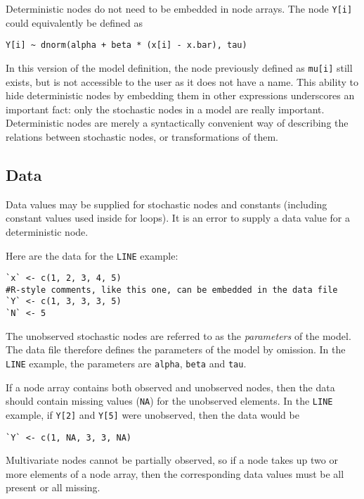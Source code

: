 \documentclass[11pt, a4paper, titlepage]{report}
\newcommand{\R}{\textsf{R}}
\begin{document}
Deterministic nodes do not need to be embedded in node arrays. The
node \verb+Y[i]+ could equivalently be defined as
\begin{verbatim}
Y[i] ~ dnorm(alpha + beta * (x[i] - x.bar), tau)
\end{verbatim}
In this version of the model definition, the node previously defined
as \verb+mu[i]+ still exists, but is not accessible to the user as it
does not have a name.  This ability to hide deterministic nodes by
embedding them in other expressions underscores an important fact:
only the stochastic nodes in a model are really
important. Deterministic nodes are merely a syntactically convenient
way of describing the relations between stochastic nodes, or
transformations of them.

\subsection{Data}
\label{section:data}

Data values may be supplied for stochastic
nodes and constants (including constant values used inside for
loops).
It is an error to supply a data value for a deterministic
node.

Here are the data for the \verb+LINE+ example:
\begin{verbatim}
`x` <- c(1, 2, 3, 4, 5)
#R-style comments, like this one, can be embedded in the data file
`Y` <- c(1, 3, 3, 3, 5)
`N` <- 5
\end{verbatim}

The unobserved stochastic nodes are referred to as the {\em
  parameters} of the model. The data file therefore defines the
parameters of the model by omission. In the \verb+LINE+ example, the
parameters are \texttt{alpha}, \texttt{beta} and \texttt{tau}.

If a node array contains both observed and unobserved nodes, then the
data should contain missing values (\texttt{NA}) for the unobserved
elements. In the \verb+LINE+ example, if \verb+Y[2]+ and \verb+Y[5]+
were unobserved, then the data would be
\begin{verbatim}
`Y` <- c(1, NA, 3, 3, NA)
\end{verbatim}
Multivariate nodes cannot be partially observed, so if a node takes up
two or more elements of a node array, then the corresponding data
values must be all present or all missing.
\end{document}

